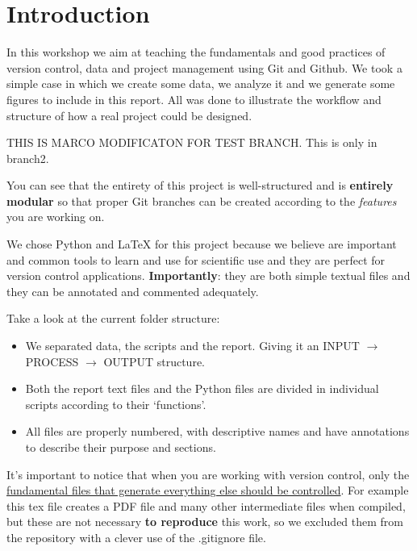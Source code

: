 \section{Introduction}

In this workshop we aim at teaching the fundamentals and good practices of version control, data and project management using Git and Github. We took a simple case in which we create some data, we analyze it and we generate some figures to include in this report. All was done to illustrate the workflow and structure of how a real project could be designed.

THIS IS MARCO MODIFICATON FOR TEST BRANCH. This is only in branch2.

You can see that the entirety of this project is well-structured and is \textbf{entirely modular} so that proper Git branches can be created according to the \textit{features} you are working on.

We chose Python and \LaTeX\xspace for this project because we believe are important and common tools to learn and use for scientific use and they are perfect for version control applications. \textbf{Importantly}: they are both simple textual files and they can be annotated and commented adequately.

Take a look at the current folder structure:

\begin{itemize}
    \item We separated data, the scripts and the report. Giving it an INPUT $\rightarrow$ PROCESS $\rightarrow$ OUTPUT structure.
    \item Both the report text files and the Python files are divided in individual scripts according to their `functions'.
    \item All files are properly numbered, with descriptive names and have annotations to describe their purpose and sections.
\end{itemize}

It's important to notice that when you are working with version control, only the \underline{fundamental files that generate everything else should be controlled}. For example this tex file creates a PDF file and many other intermediate files when compiled, but these are not necessary \textbf{to reproduce} this work, so we excluded them from the repository with a clever use of the .gitignore file.